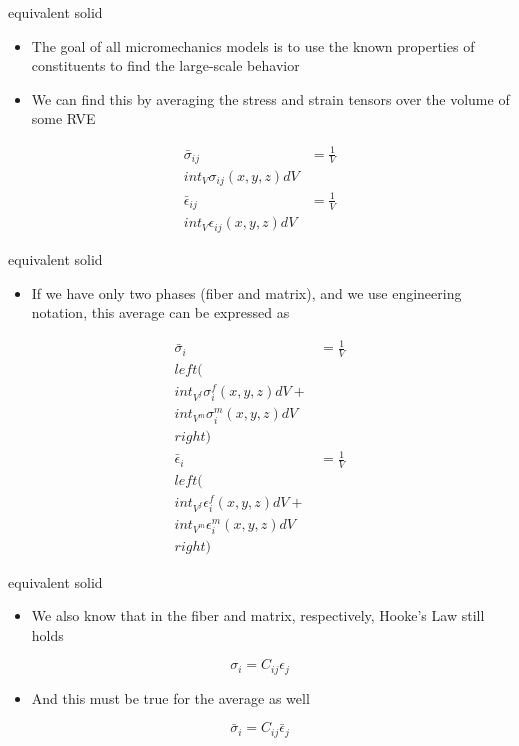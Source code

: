 \documentclass[
  letterpaper,
  ignorenonframetext,
  aspectratio=43,
  handout,
  12pt]{beamer}
\providecommand{\tightlist}{%
  \setlength{\itemsep}{0pt}\setlength{\parskip}{0pt}}
\providecommand{\tightlist}{%
\setlength{\itemsep}{0pt}\setlength{\parskip}{0pt}}
\begin{document}
\begin{frame}{equivalent solid}
\protect\hypertarget{equivalent-solid}{}
\begin{itemize}
\tightlist
\item
  The goal of all micromechanics models is to use the known properties
  of constituents to find the large-scale behavior
\item
  We can find this by averaging the stress and strain tensors over the
  volume of some RVE
\end{itemize}

\[\begin{aligned}
  \bar{\sigma}_{ij} &= \frac{1}{V}\\int_V \sigma_{ij}(x,y,z) dV\\
  \bar{\epsilon}_{ij} &= \frac{1}{V}\\int_V \epsilon_{ij}(x,y,z) dV
\end{aligned}\]
\end{frame}

\begin{frame}{equivalent solid}
\protect\hypertarget{equivalent-solid-1}{}
\begin{itemize}
\tightlist
\item
  If we have only two phases (fiber and matrix), and we use engineering
  notation, this average can be expressed as
\end{itemize}

\[\begin{aligned}
  \bar{\sigma}_{i} &= \frac{1}{V}\\left(\\int_{V^f} \sigma^f_{i}(x,y,z) dV  + \\int_{V^m} \sigma^m_{i}(x,y,z) dV\\right)\\
  \bar{\epsilon}_{i} &= \frac{1}{V}\\left(\\int_{V^f} \epsilon^f_{i}(x,y,z) dV  + \\int_{V^m} \epsilon^m_{i}(x,y,z) dV\\right)
\end{aligned}\]
\end{frame}

\begin{frame}{equivalent solid}
\protect\hypertarget{equivalent-solid-2}{}
\begin{itemize}
\tightlist
\item
  We also know that in the fiber and matrix, respectively, Hooke's Law
  still holds
\end{itemize}

\[ \sigma_i = C_{ij} \epsilon_j \]

\begin{itemize}
\tightlist
\item
  And this must be true for the average as well
\end{itemize}

\[\bar{\sigma}_i = C_{ij} \bar{\epsilon}_j\]
\end{frame}
\end{document}
